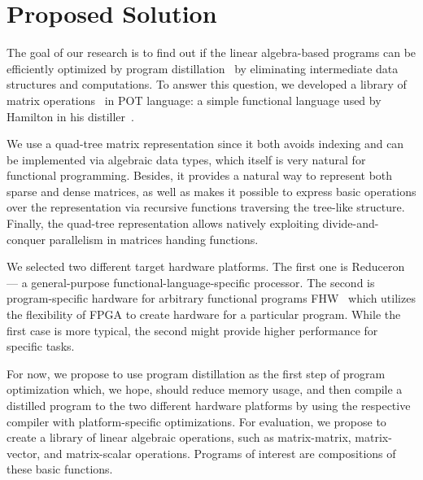 \section{Proposed Solution}

The goal of our research is to find out if the linear algebra-based programs can be efficiently optimized by program distillation~\cite{hamilton2021700} by eliminating intermediate data structures and computations.
To answer this question, we developed a library of matrix operations~ in POT language: a simple functional language used by Hamilton in his distiller~.  

We use a quad-tree matrix representation since it both avoids indexing and can be implemented via algebraic data types, which itself is very natural for functional programming.
Besides, it provides a natural way to represent both sparse and dense matrices, as well as makes it possible to express basic operations over the representation via recursive functions traversing the tree-like structure.
Finally, the quad-tree representation allows natively exploiting divide-and-conquer parallelism in matrices handing functions.

We selected two different target hardware platforms.
The first one is Reduceron~\cite{naylorRunciman2012} --- a general-purpose functional-language-specific processor.
The second is program-specific hardware for arbitrary functional programs FHW~\cite{Edwards2019FHWP} which utilizes the flexibility of FPGA to create hardware for a particular program.
While the first case is more typical, the second might provide higher performance for specific tasks.

For now, we propose to use program distillation as the first step of program optimization which, we hope, should reduce memory %
usage, and then compile a distilled program to the two different hardware platforms by using the respective compiler with platform-specific optimizations.
For evaluation, we propose  to create a library of linear algebraic operations, such as matrix-matrix, matrix-vector, and matrix-scalar operations.
Programs of interest are compositions of these basic functions.
